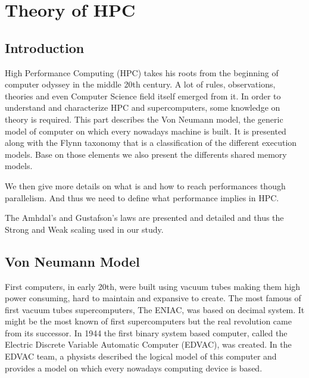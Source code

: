 
\chapter{Theory of HPC}

\section{Introduction}

High Performance Computing (HPC) takes his roots from the beginning of computer odyssey in the middle 20th century.
A lot of rules, observations, theories and even Computer Science field itself emerged from it. 
In order to understand and characterize HPC and supercomputers, some knowledge on theory is required. 
This part describes the Von Neumann model, the generic model of computer on which every nowadays machine is built.
It is presented along with the Flynn taxonomy that is a classification of the different execution models. 
Base on those elements we also present the differents shared memory models. 

We then give more details on what is and how to reach performances though parallelism. 
And thus we need to define what performance implies in HPC. 

The Amhdal's and Gustafson's laws are presented and detailed and thus the Strong and Weak scaling used in our study. 

\section{Von Neumann Model}
First computers, in early 20th, were built using vacuum tubes making them high power consuming, hard to maintain and expansive to create.
The most famous of first vacuum tubes supercomputers, The ENIAC, was based on decimal system.
It might be the most known of first supercomputers but the real revolution came from its successor.
In 1944 the first binary system based computer, called the Electric Discrete Variable Automatic Computer (EDVAC), was created. 
In the EDVAC team, a physists described the logical model of this computer and provides a model on which every nowadays computing device is based. 

